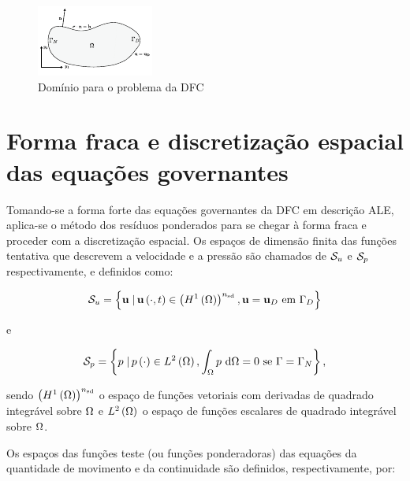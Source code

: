 \begin{figure}[H]
	\caption{Domínio para o problema da DFC}
	\begin{center}
		\includegraphics[scale=3.0,trim=0cm 0.0cm 0cm 0.0cm, clip=true]{Imagens/Cap2/dominioFluido.pdf}	
	\end{center}
	\label{fig:dominioFluido}
\end{figure}


\section{Forma fraca e discretização espacial das equações governantes} \label{capitulo:Cap2:FormaFraca}

Tomando-se a forma forte das equações governantes da DFC em descrição ALE, aplica-se o método dos resíduos ponderados para se chegar à forma fraca e proceder com a discretização espacial. Os espaços de dimensão finita das funções tentativa que descrevem a velocidade e a pressão são chamados de $\mathcal{S}_u$ e $\mathcal{S}_p$ respectivamente, e definidos como:

\begin{align}
\mathcal{S}_u = \left\{\mathbf{u} \left . \right| \mathbf{u} \left(\cdot,t\right) \in \left(H^{1}\left(\Omega\right)\right)^{{n_{\mathrm{sd}}}}, \mathbf{u} = \mathbf{u}_D \ \textrm {em} \ \Gamma_{D} \right\}
\end{align}

\noindent e

\begin{align}
\mathcal{S}_p = \left\{p \left . \right| p \left(\cdot\right) \in L^{2}\left(\Omega\right), \int_{\Omega}p \textrm { } \mathrm{d} \Omega = 0 \textrm { se } \Gamma = \Gamma_{N} \right\},
\end{align}

\noindent sendo $\left(H^{1}\left(\Omega\right)\right)^{{n_{\mathrm{sd}}}}$ o espaço de funções vetoriais com derivadas de quadrado integrável sobre $\Omega$ e $L^{2}\left(\Omega\right)$ o espaço de funções escalares de quadrado integrável sobre $\Omega$.

Os espaços das funções teste (ou funções ponderadoras) das equações da quantidade de movimento e da continuidade são definidos, respectivamente, por:

